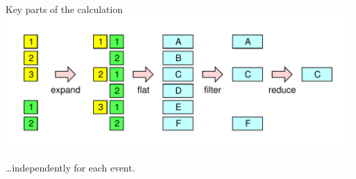 \documentclass[aspectratio=169]{beamer}
\begin{document}
\begin{frame}{Key parts of the calculation}
\Large
\vspace{0.5 cm}
\includegraphics[width=\linewidth]{explode-flat-reduce.pdf}

\hfill \ldots independently for each event.
\end{frame}
\end{document}
